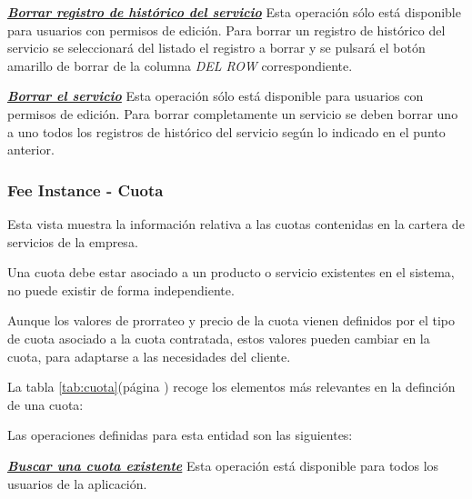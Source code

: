 \underline{\textsl{\textbf{Borrar registro de histórico del servicio}}}\newline
Esta operación sólo está disponible para usuarios con permisos de edición.
Para borrar un registro de histórico del servicio se seleccionará del listado el registro a borrar y se pulsará el botón amarillo de borrar de la columna \textit{DEL ROW} correspondiente.\newline

\underline{\textsl{\textbf{Borrar el servicio}}}\newline
Esta operación sólo está disponible para usuarios con permisos de edición.
Para borrar completamente un servicio se deben borrar uno a uno todos los registros de histórico del servicio según lo indicado en el punto anterior. 



\subsubsection{Fee Instance - Cuota}
\label{sub:fee}

Esta vista muestra la información relativa a las cuotas contenidas en la cartera de servicios de la empresa.

Una cuota debe estar asociado a un producto o servicio existentes en el sistema, no puede existir de forma independiente.

Aunque los valores de prorrateo y precio de la cuota vienen definidos por el tipo de cuota asociado a la cuota contratada, estos valores pueden cambiar en la cuota, para adaptarse a las necesidades del cliente.


La tabla \ref{tab:cuota}(página \pageref{tab:cuota}) recoge los elementos más relevantes en la definción de una cuota:



Las operaciones definidas para esta entidad son las siguientes:


\underline{\textsl{\textbf{Buscar una cuota existente}}}\newline
Esta operación está disponible para todos los usuarios de la aplicación.

